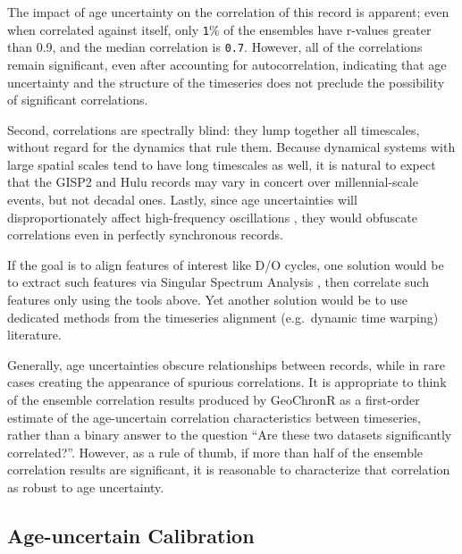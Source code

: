 \documentclass[gchron, manuscript]{copernicus}
\begin{document}
The impact of age uncertainty on the correlation of this record is apparent; even when correlated against itself, only \texttt{1}\% of the ensembles have r-values greater than 0.9, and the median correlation is \texttt{0.7}.
However, all of the correlations remain significant, even after accounting for autocorrelation, indicating that age uncertainty and the structure of the timeseries does not preclude the possibility of significant correlations.

Second, correlations are spectrally blind: they lump together all timescales, without regard for the dynamics that rule them. Because dynamical systems with large spatial scales tend to have long timescales as well, it is natural to expect that the GISP2 and Hulu records may vary in concert over millennial-scale events, but not decadal ones. Lastly, since age uncertainties will disproportionately affect high-frequency oscillations \citep[e.g.][]{Comboul_CP14}, they would obfuscate correlations even in perfectly synchronous records.

If the goal is to align features of interest like D/O cycles, one solution would be to extract such features via Singular Spectrum Analysis \citep[Vautard89]{Vautard1992}, then correlate such features only using the tools above. Yet another solution would be to use dedicated methods from the timeseries alignment (e.g.~dynamic time warping) literature.

Generally, age uncertainties obscure relationships between records, while in rare cases creating the appearance of spurious correlations. It is appropriate to think of the ensemble correlation results produced by GeoChronR as a first-order estimate of the age-uncertain correlation characteristics between timeseries, rather than a binary answer to the question ``Are these two datasets significantly correlated?''.
However, as a rule of thumb, if more than half of the ensemble correlation results are significant, it is reasonable to characterize that correlation as robust to age uncertainty.

\subsection{Age-uncertain Calibration}
\end{document}
